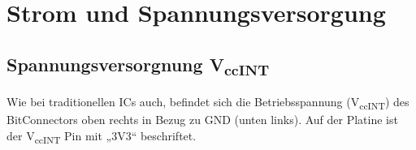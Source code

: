 \documentclass{article}
\begin{document}
\section{Strom und Spannungsversorgung}

\subsection{Spannungsversorgnung V\textsubscript{ccINT}}
Wie bei traditionellen ICs auch, befindet sich die Betriebsspannung (V\textsubscript{ccINT}) des BitConnectors oben rechts  in Bezug zu GND (unten links).
Auf der Platine ist der V\textsubscript{ccINT} Pin mit „3V3“ beschriftet.
\\\\
\\\\
\end{document}
